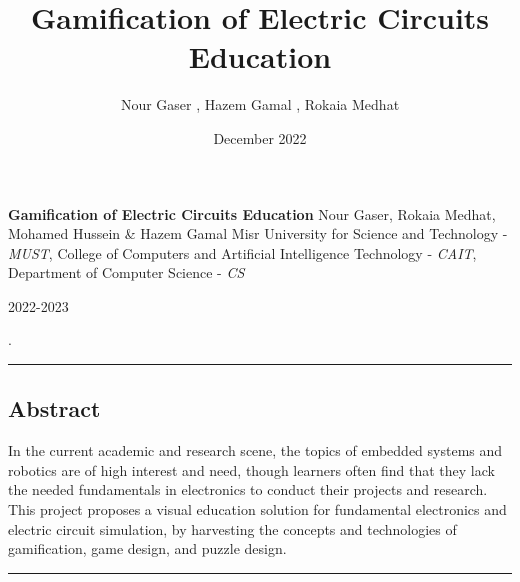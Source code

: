 \documentclass[twoside,a4paper,11pt]{article}
\title{Gamification of Electric
 Circuits Education}
\author{Nour Gaser , Hazem Gamal , Rokaia Medhat  }
\date{December 2022}
\begin{document}
\begin{center}
\LARGE
\textbf{Gamification of Electric Circuits Education}
\newline
\hfill \break
\large
Nour Gaser, Rokaia Medhat, Mohamed Hussein \& Hazem Gamal
 \newline
\hfill \break
\normalsize
Misr University for Science and Technology -\textit{ MUST}, College of Computers and Artificial Intelligence Technology - \textit{CAIT}, Department of Computer Science - \textit{CS}

\hfill \break
\normalsize
\large 2022-2023   
\end{center}
\pagestyle{fancy}
\setlength{\headheight}{1.5cm}.

\centering
\hrule
\subsection*{Abstract} 
\footnotesize
\centering
In the current academic and research scene, the topics of embedded systems and robotics are of high interest and need, though learners often find that they lack the needed fundamentals in electronics to conduct their projects and research. This project proposes a visual education solution for fundamental electronics and electric circuit simulation, by harvesting the concepts and technologies of gamification, game design, and puzzle design. 

\hfill \break
\hrule
\end{document}
